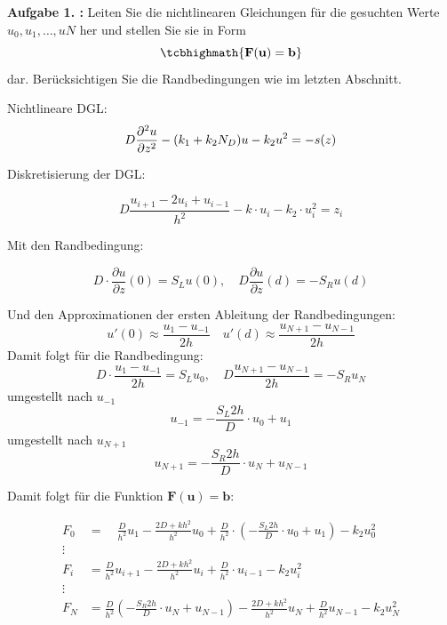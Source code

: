\begin{mybox}
	\textbf{Aufgabe 1. :} Leiten Sie die nichtlinearen Gleichungen für die gesuchten Werte $u_0,u_1,\dots ,uN$ her und stellen Sie
	sie in Form
	\begin{equation*}
		\tcbhighmath{\mathbf{F}(\mathbf{u})=\mathbf{b}}
	\end{equation*}
dar. Berücksichtigen Sie die Randbedingungen wie im letzten Abschnitt.
\cite{Prof.Dr.AndreasZeiser.April2021}
\end{mybox}
Nichtlineare DGL:
\begin{equation}
	D\pdv[2]{u}{z}-(k_1+k_2N_D)u-k_2u^2=-s(z)
\end{equation}

Diskretisierung der DGL:

\begin{equation}
	D\frac{u_{i+1}-2u_i+u_{i-1}}{h^2}-k\cdot u_i-k_2 \cdot u_i^2=z_i
\end{equation}

Mit den Randbedingung:

\begin{equation}
	D\cdot \frac{\partial u}{\partial z}(0)=S_Lu(0),\quad D\frac{\partial u}{\partial z}(d)=-S_Ru(d)
\end{equation}

Und den Approximationen der ersten Ableitung der  Randbedingungen:
\begin{equation}
	u'(0)\approx \frac{u_1-u_{-1}}{2h} \quad u'(d)\approx \frac{u_{N+1}-u_{N-1}}{2h}
\end{equation}
Damit folgt für die Randbedingung:
\begin{equation}
	D\cdot \frac{u_1-u_{-1}}{2h}=S_Lu_0,\quad D\frac{u_{N+1}-u_{N-1}}{2h}=-S_Ru_N
\end{equation}
umgestellt nach $u_{-1}$
\begin{equation}
	u_{-1}=-\frac{S_L 2h}{D}\cdot u_0+u_1
\end{equation}
umgestellt nach $u_{N+1}$
\begin{equation}
	u_{N+1}=-\frac{S_R2h}{D}\cdot u_N+u_{N-1}
\end{equation}



Damit folgt für die Funktion $\mathbf{F}(\mathbf{u})=\mathbf{b}$:

\begin{align*}
	F_0&= \quad \frac{D}{h^2}u_1-\frac{2D+kh^2}{h^2}u_0+\frac{D}{h^2}\cdot\left( -\frac{S_L 2h}{D}\cdot u_0+u_1\right) -k_2u_0^2\\
	\vdots \\
	F_i&= 	\frac{D}{h^2}u_{i+1}-\frac{2D+kh^2}{h^2}u_i+\frac{D}{h^2}\cdot u_{i-1} -k_2u_i^2\\
	\vdots \\
	F_N &= \frac{D}{h^2}\left( -\frac{S_R2h}{D}\cdot u_N+u_{N-1}\right) -\frac{2D+kh^2}{h^2}u_N+\frac{D}{h^2} u_{N-1}-k_2u^2_N\\
\end{align*}


